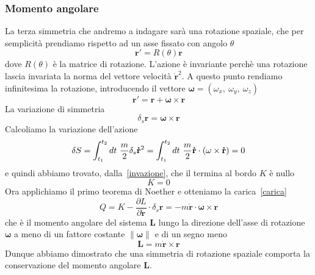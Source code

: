 \begin{example}
    \subsubsection{Momento angolare}
        La terza simmetria che andremo a indagare sarà una rotazione spaziale, che per semplicità prendiamo rispetto ad un asse fissato con angolo $\theta$
    \begin{equation}
        \mathbf r' = R(\theta) \mathbf r
    \end{equation}
        dove $R(\theta)$ è la matrice di rotazione. L'azione è invariante perchè una rotazione lascia invariata la norma del vettore velocità $\mathbf{\dot r}^2$. A questo punto rendiamo infinitesima la rotazione, introducendo il vettore $\boldsymbol \omega = (\omega_x,~\omega_y,~\omega_z)$
    \begin{equation}
        \mathbf r' = \mathbf r + \boldsymbol \omega \times \mathbf r
    \end{equation}
        La variazione di simmetria 
    \begin{equation*}
        \delta_s \mathbf r = \boldsymbol \omega \times \mathbf r
    \end{equation*}
        Calcoliamo la variazione dell'azione
    \begin{equation}
        \delta S = \int_{t_1}^{t_2}dt~ \frac{m}{2} \delta_s \mathbf{\dot r}^2 = \int_{t_1}^{t_2}dt~ \frac{m}{2} \mathbf{\dot r} \cdot (\omega \times \mathbf{\dot r} ) = 0
    \end{equation}
        e quindi abbiamo trovato, dalla~\eqref{invazione}, che il termina al bordo $K$ è nullo
    \begin{equation*}
        K = 0
    \end{equation*}
        Ora applichiamo il primo teorema di Noether e otteniamo la carica~\eqref{carica} 
    \begin{equation}
        Q = K - \frac{\partial L}{\partial \mathbf{\dot r}} \cdot \delta_s \mathbf r = - m \mathbf{\dot r} \cdot \boldsymbol\omega \times \mathbf r 
    \end{equation}
        che è il momento angolare del sistema $\mathbf L$ lungo la direzione dell'asse di rotazione $\boldsymbol \omega$ a meno di un fattore costante $\|\boldsymbol \omega\|$ e di un segno meno
    \begin{equation*}
        \mathbf L = m \mathbf{\dot r} \times \mathbf r
    \end{equation*}
        Dunque abbiamo dimostrato che una simmetria di rotazione spaziale comporta la conservazione del momento angolare $\mathbf L$.


\end{example}
